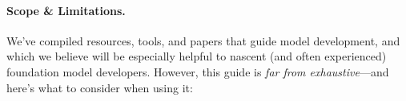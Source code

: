 
\paragraph{Scope \& Limitations.} 
We've compiled resources, tools, and papers that guide model development, and which we believe will be especially helpful to nascent (and often experienced) foundation model developers.
However, this guide is \emph{far from exhaustive}---and here's what to consider when using it:

